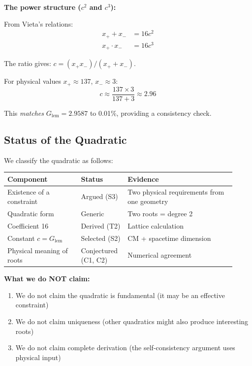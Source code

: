 \documentclass[11pt,a4paper]{article}
\theoremstyle{definition}
\theoremstyle{remark}
\newcommand{\Glem}{G_{\text{lem}}}
\begin{document}
\textbf{The power structure ($c^2$ and $c^3$):}

From Vieta's relations:
\begin{align}
    x_+ + x_- &= 16c^2 \\
    x_+ \cdot x_- &= 16c^3
\end{align}

The ratio gives: $c = (x_+ x_-)/(x_+ + x_-)$.

For physical values $x_+ \approx 137$, $x_- \approx 3$:
\begin{equation}
    c \approx \frac{137 \times 3}{137 + 3} \approx 2.96
\end{equation}

This \emph{matches} $\Glem = 2.9587$ to 0.01\%, providing a consistency check.

\subsection{Status of the Quadratic}

We classify the quadratic as follows:

\begin{center}
\begin{tabular}{@{}p{0.30\linewidth}p{0.18\linewidth}p{0.44\linewidth}@{}}
\toprule
Component & Status & Evidence \\
\midrule
Existence of a constraint & Argued (S3) & Two physical requirements from one geometry \\
Quadratic form & Generic & Two roots = degree 2 \\
Coefficient 16 & Derived (T2) & Lattice calculation \\
Constant $c = \Glem$ & Selected (S2) & CM + spacetime dimension \\
Physical meaning of roots & Conjectured (C1, C2) & Numerical agreement \\
\bottomrule
\end{tabular}
\end{center}

\textbf{What we do NOT claim:}
\begin{enumerate}
    \item We do not claim the quadratic is fundamental (it may be an effective constraint)
    \item We do not claim uniqueness (other quadratics might also produce interesting roots)
    \item We do not claim complete derivation (the self-consistency argument uses physical input)
\end{enumerate}
\end{document}
